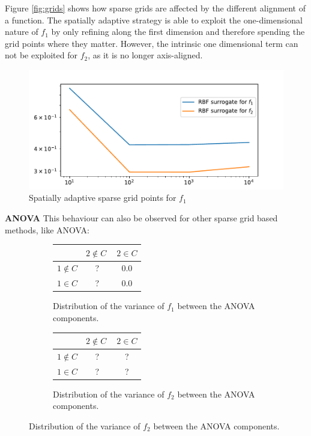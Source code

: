 \documentclass[
  a4paper,  %
  twoside,  %
  bibliography=totoc,
  headsepline,
  cleardoublepage=empty,
  parskip=half,
  draft=false
]{scrbook}
\begin{document}
Figure \ref{fig:grids} shows how sparse grids are affected by the different alignment of a function.
The spatially adaptive strategy is able to exploit the one-dimensional nature of $f_1$ by only refining along the first dimension and therefore spending the grid points where they matter.
However, the intrinsic one dimensional term can not be exploited for $f_2$, as it is no longer axis-aligned.
\begin{figure}[H]
  \centering
  \includegraphics[width=.8\linewidth]{graphics/rbf_errors}
  \caption{Spatially adaptive sparse grid points for $f_1$}
  \label{fig:grid_errors}
\end{figure}


\textbf{ANOVA}
This behaviour can also be observed for other sparse grid based methods, like ANOVA:

\begin{figure}[H]
\begin{subfigure}{.5\textwidth}
  \centering
  \begin{tabular}{ l c c }
\hline \hline
& $2 \notin C~$ & $2 \in C$ \\
\hline
$1 \notin C$ & ? & 0.0\\
$1 \in C$ & ? & 0.0\\
\end{tabular}
  \caption{Distribution of the variance of $f_1$ between the ANOVA components.}
  \label{fig:anova_f1}
\end{subfigure}
\begin{subfigure}{.5\textwidth}
  \centering
  \begin{tabular}{ l c c }
\hline \hline
& $2 \notin C~$ & $2 \in C$ \\
\hline
$1 \notin C$ & ? & ?\\
$1 \in C$ & ? & ?\\
\end{tabular}
  \caption{Distribution of the variance of $f_2$ between the ANOVA components.}
  \label{fig:anova_f2}
\end{subfigure}
\end{figure}
\end{document}
